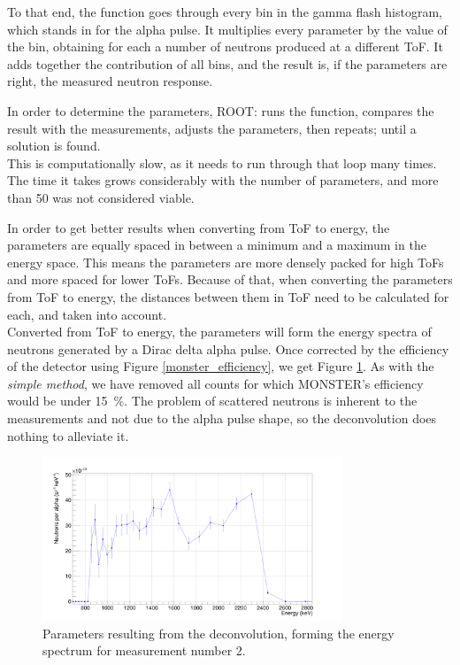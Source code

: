 \documentclass[a4paper,12pt]{report}
\begin{document}
To that end, the function goes through every bin in the gamma flash histogram, which stands in for the alpha pulse.
It multiplies every parameter by the value of the bin, obtaining for each a number of neutrons produced at a different ToF.
It adds together the contribution of all bins, and the result is, if the parameters are right, the measured neutron response.

In order to determine the parameters, ROOT: runs the function, compares the result with the measurements, adjusts the parameters, then repeats; until a solution is found.
\\

This is computationally slow, as it needs to run through that loop many times.
The time it takes grows considerably with the number of parameters, and more than 50 was not considered viable.

In order to get better results when converting from ToF to energy, the parameters are equally spaced in between a minimum and a maximum in the energy space.
This means the parameters are more densely packed for high ToFs and more spaced for lower ToFs.
Because of that, when converting the parameters from ToF to energy, the distances between them in ToF need to be calculated for each, and taken into account.
\\

Converted from ToF to energy, the parameters will form the energy spectra of neutrons generated by a Dirac delta alpha pulse.
Once corrected by the efficiency of the detector using Figure \ref{monster_efficiency}, we get Figure \ref{pulsed_deconvolution}.
As with the \textit{simple method}, we have removed all counts for which MONSTER's efficiency would be under \qty{15}{\percent}.
The problem of scattered neutrons is inherent to the measurements and not due to the alpha pulse shape, so the deconvolution does nothing to alleviate it.

\begin{figure}[H]
	\centering
	\includegraphics[width=0.80\textwidth]{pulsed_deconvolution.png}
	\caption{Parameters resulting from the deconvolution, forming the energy spectrum for measurement number 2.}
	\label{pulsed_deconvolution}
\end{figure}
\end{document}
